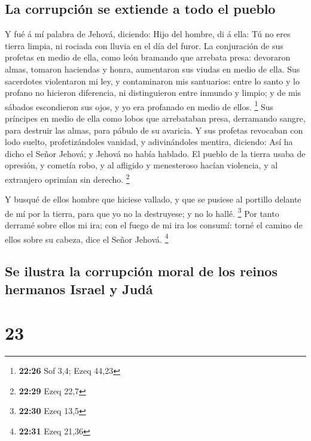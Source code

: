\hypertarget{la-corrupciuxf3n-se-extiende-a-todo-el-pueblo}{%
\subsection{La corrupción se extiende a todo el
pueblo}\label{la-corrupciuxf3n-se-extiende-a-todo-el-pueblo}}

 Y fué á mí palabra de Jehová, diciendo:  Hijo
del hombre, di á ella: Tú no eres tierra limpia, ni rociada con lluvia
en el día del furor.  La conjuración de sus profetas en
medio de ella, como león bramando que arrebata presa: devoraron almas,
tomaron haciendas y honra, aumentaron sus viudas en medio de ella.
 Sus sacerdotes violentaron mi ley, y contaminaron mis
santuarios: entre lo santo y lo profano no hicieron diferencia, ni
distinguieron entre inmundo y limpio; y de mis sábados escondieron sus
ojos, y yo era profanado en medio de ellos. \footnote{\textbf{22:26} Sof
  3,4; Ezeq 44,23}  Sus príncipes en medio de ella como
lobos que arrebataban presa, derramando sangre, para destruir las almas,
para pábulo de su avaricia.  Y sus profetas revocaban con
lodo suelto, profetizándoles vanidad, y adivinándoles mentira, diciendo:
Así ha dicho el Señor Jehová; y Jehová no había hablado. 
El pueblo de la tierra usaba de opresión, y cometía robo, y al afligido
y menesteroso hacían violencia, y al extranjero oprimían sin derecho.
\footnote{\textbf{22:29} Ezeq 22,7}

 Y busqué de ellos hombre que hiciese vallado, y que se
pusiese al portillo delante de mí por la tierra, para que yo no la
destruyese; y no lo hallé. \footnote{\textbf{22:30} Ezeq 13,5}
 Por tanto derramé sobre ellos mi ira; con el fuego de mi
ira los consumí: torné el camino de ellos sobre su cabeza, dice el Señor
Jehová. \footnote{\textbf{22:31} Ezeq 21,36}

\hypertarget{se-ilustra-la-corrupciuxf3n-moral-de-los-reinos-hermanos-israel-y-juduxe1}{%
\subsection{Se ilustra la corrupción moral de los reinos hermanos Israel
y
Judá}\label{se-ilustra-la-corrupciuxf3n-moral-de-los-reinos-hermanos-israel-y-juduxe1}}

\hypertarget{section-22}{%
\section{23}\label{section-22}}

